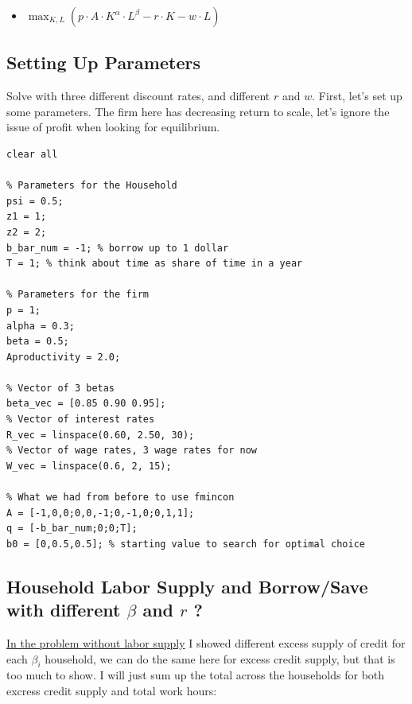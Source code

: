 \documentclass[
]{book}
\providecommand{\tightlist}{%
  \setlength{\itemsep}{0pt}\setlength{\parskip}{0pt}}
\begin{document}
\begin{itemize}
\tightlist
\item
  \(\displaystyle \max_{K,L} \left(p\cdot A\cdot K^{\alpha } \cdot L^{\beta } -r\cdot K-w\cdot L\right)\)
\end{itemize}

\hypertarget{setting-up-parameters}{%
\subsection{Setting Up Parameters}\label{setting-up-parameters}}

Solve with three different discount rates, and different \(r\) and \(w\).
First, let's set up some parameters. The firm here has decreasing return
to scale, let's ignore the issue of profit when looking for equilibrium.

\begin{verbatim}
clear all

% Parameters for the Household
psi = 0.5;
z1 = 1;
z2 = 2;
b_bar_num = -1; % borrow up to 1 dollar
T = 1; % think about time as share of time in a year

% Parameters for the firm
p = 1;
alpha = 0.3;
beta = 0.5;
Aproductivity = 2.0;

% Vector of 3 betas
beta_vec = [0.85 0.90 0.95];
% Vector of interest rates
R_vec = linspace(0.60, 2.50, 30);
% Vector of wage rates, 3 wage rates for now
W_vec = linspace(0.6, 2, 15);

% What we had from before to use fmincon
A = [-1,0,0;0,0,-1;0,-1,0;0,1,1];
q = [-b_bar_num;0;0;T];
b0 = [0,0.5,0.5]; % starting value to search for optimal choice
\end{verbatim}

\hypertarget{household-labor-supply-and-borrowsave-with-different-beta-and-r}{%
\subsection{\texorpdfstring{Household Labor Supply and Borrow/Save with different \(\beta\) and \(r\) ?}{Household Labor Supply and Borrow/Save with different \textbackslash beta and r ?}}\label{household-labor-supply-and-borrowsave-with-different-beta-and-r}}

\href{https://math4econ.github.io/equilibrium/equilibrium_constrainedborrow.html}{In the problem without labor
supply}
I showed different excess supply of credit for each \(\beta_i\) household,
we can do the same here for excess credit supply, but that is too much
to show. I will just sum up the total across the households for both
excress credit supply and total work hours:
\end{document}
